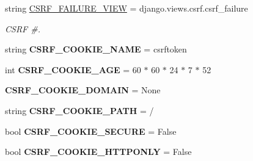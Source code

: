 \begin{DoxyCompactItemize}
string \mbox{\hyperlink{namespacedjango_1_1conf_1_1global__settings_af57fc3caa7d529be0f174d0d01f57e52}{C\+S\+R\+F\+\_\+\+F\+A\+I\+L\+U\+R\+E\+\_\+\+V\+I\+EW}} = \textquotesingle{}django.\+views.\+csrf.\+csrf\+\_\+failure\textquotesingle{}
\begin{DoxyCompactList}\small\item\em C\+S\+RF \#. \end{DoxyCompactList}\item 
\mbox{\label{namespacedjango_1_1conf_1_1global__settings_a8c923267fcd27c09453a85fd451aee8a}} 
string {\bfseries C\+S\+R\+F\+\_\+\+C\+O\+O\+K\+I\+E\+\_\+\+N\+A\+ME} = \textquotesingle{}csrftoken\textquotesingle{}
\item 
\mbox{\label{namespacedjango_1_1conf_1_1global__settings_a134f4a641c67aa5463cd4831098f4d09}} 
int {\bfseries C\+S\+R\+F\+\_\+\+C\+O\+O\+K\+I\+E\+\_\+\+A\+GE} = 60 $\ast$ 60 $\ast$ 24 $\ast$ 7 $\ast$ 52
\item 
\mbox{\label{namespacedjango_1_1conf_1_1global__settings_ab4b4d3f0fd953d2508f1421f40f2807a}} 
{\bfseries C\+S\+R\+F\+\_\+\+C\+O\+O\+K\+I\+E\+\_\+\+D\+O\+M\+A\+IN} = None
\item 
\mbox{\label{namespacedjango_1_1conf_1_1global__settings_a619382ab508c686abc4996f7f932e5cc}} 
string {\bfseries C\+S\+R\+F\+\_\+\+C\+O\+O\+K\+I\+E\+\_\+\+P\+A\+TH} = \textquotesingle{}/\textquotesingle{}
\item 
\mbox{\label{namespacedjango_1_1conf_1_1global__settings_ab5a603f1c2091add7f560fcc01fbcff2}} 
bool {\bfseries C\+S\+R\+F\+\_\+\+C\+O\+O\+K\+I\+E\+\_\+\+S\+E\+C\+U\+RE} = False
\item 
\mbox{\label{namespacedjango_1_1conf_1_1global__settings_af459dba2575a5996c8b201c5e05ae7ad}} 
bool {\bfseries C\+S\+R\+F\+\_\+\+C\+O\+O\+K\+I\+E\+\_\+\+H\+T\+T\+P\+O\+N\+LY} = False
\item 
\mbox{\label{namespacedjango_1_1conf_1_1global__settings_a428fb55424e65eb74476a267e072a0d2}} 

\end{DoxyCompactItemize}
